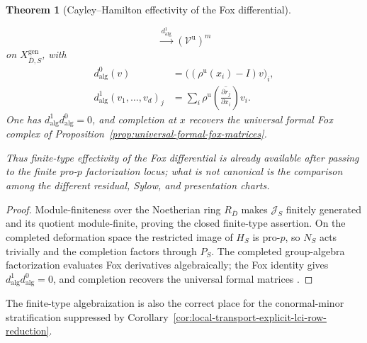 \documentclass[11pt]{article}
\newtheorem{theorem}{Theorem}[section]
\theoremstyle{definition}
\begin{document}
\begin{theorem}[Cayley--Hamilton effectivity of the Fox differential]
\begin{enumerate}[label=\textnormal{(\roman*)}]
\begin{equation}
 \xrightarrow{\ d^1_{\mathrm{alg}}\ }
 (\mathcal V^{\mathrm u})^m
\end{equation}
on $X_{\bar D,S}^{\mathrm{gen}}$, with
\begin{align}
 d^0_{\mathrm{alg}}(v)
 &=\bigl((\rho^{\mathrm u}(x_i)-I)v\bigr)_i,\label{eq:algebraic-ch-fox-d0}\\
 d^1_{\mathrm{alg}}(v_1,\ldots,v_d)_j
 &=\sum_i
 \rho^{\mathrm u}\!\left(
 \overline{\frac{\partial r_j}{\partial x_i}}
 \right)v_i.\label{eq:algebraic-ch-fox-d1}
\end{align}
One has $d^1_{\mathrm{alg}}d^0_{\mathrm{alg}}=0$, and completion at $x$ recovers the universal formal Fox complex of Proposition~\ref{prop:universal-formal-fox-matrices}.
\end{enumerate}
Thus finite-type effectivity of the Fox differential is already available after passing to the finite pro-$p$ factorization locus; what is not canonical is the comparison among the different residual, Sylow, and presentation charts.
\end{theorem}

\begin{proof}
Module-finiteness over the Noetherian ring $R_{\bar D}$ makes $\mathcal J_S$ finitely generated and its quotient module-finite, proving the closed finite-type assertion.  On the completed deformation space the restricted image of $H_S$ is pro-$p$, so $N_S$ acts trivially and the completion factors through $P_S$.  The completed group-algebra factorization evaluates Fox derivatives algebraically; the Fox identity gives $d^1_{\mathrm{alg}}d^0_{\mathrm{alg}}=0$, and completion recovers the universal formal matrices \cite{WangEricksonFamilies}.
\end{proof}

The finite-type algebraization is also the correct place for the conormal-minor
stratification suppressed by Corollary~\ref{cor:local-transport-explicit-lci-row-reduction}.
\end{document}
